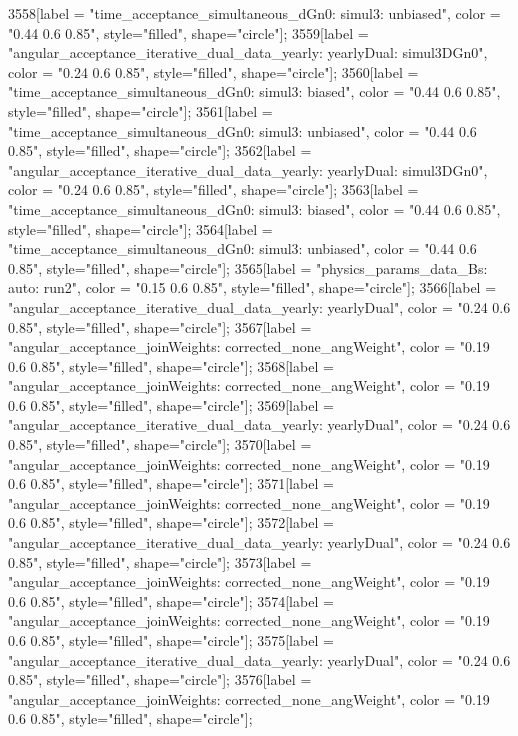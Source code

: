 {	3558[label = "time_acceptance_simultaneous_dGn0\ntimeacc: simul3\ntrigger: unbiased", color = "0.44 0.6 0.85", style="filled", shape="circle"];
	3559[label = "angular_acceptance_iterative_dual_data_yearly\nangacc: yearlyDual\ntimeacc: simul3DGn0", color = "0.24 0.6 0.85", style="filled", shape="circle"];
	3560[label = "time_acceptance_simultaneous_dGn0\ntimeacc: simul3\ntrigger: biased", color = "0.44 0.6 0.85", style="filled", shape="circle"];
	3561[label = "time_acceptance_simultaneous_dGn0\ntimeacc: simul3\ntrigger: unbiased", color = "0.44 0.6 0.85", style="filled", shape="circle"];
	3562[label = "angular_acceptance_iterative_dual_data_yearly\nangacc: yearlyDual\ntimeacc: simul3DGn0", color = "0.24 0.6 0.85", style="filled", shape="circle"];
	3563[label = "time_acceptance_simultaneous_dGn0\ntimeacc: simul3\ntrigger: biased", color = "0.44 0.6 0.85", style="filled", shape="circle"];
	3564[label = "time_acceptance_simultaneous_dGn0\ntimeacc: simul3\ntrigger: unbiased", color = "0.44 0.6 0.85", style="filled", shape="circle"];
	3565[label = "physics_params_data_Bs\nfit: auto\nyear: run2", color = "0.15 0.6 0.85", style="filled", shape="circle"];
	3566[label = "angular_acceptance_iterative_dual_data_yearly\nangacc: yearlyDual", color = "0.24 0.6 0.85", style="filled", shape="circle"];
	3567[label = "angular_acceptance_joinWeights\nwflag: corrected_none_angWeight", color = "0.19 0.6 0.85", style="filled", shape="circle"];
	3568[label = "angular_acceptance_joinWeights\nwflag: corrected_none_angWeight", color = "0.19 0.6 0.85", style="filled", shape="circle"];
	3569[label = "angular_acceptance_iterative_dual_data_yearly\nangacc: yearlyDual", color = "0.24 0.6 0.85", style="filled", shape="circle"];
	3570[label = "angular_acceptance_joinWeights\nwflag: corrected_none_angWeight", color = "0.19 0.6 0.85", style="filled", shape="circle"];
	3571[label = "angular_acceptance_joinWeights\nwflag: corrected_none_angWeight", color = "0.19 0.6 0.85", style="filled", shape="circle"];
	3572[label = "angular_acceptance_iterative_dual_data_yearly\nangacc: yearlyDual", color = "0.24 0.6 0.85", style="filled", shape="circle"];
	3573[label = "angular_acceptance_joinWeights\nwflag: corrected_none_angWeight", color = "0.19 0.6 0.85", style="filled", shape="circle"];
	3574[label = "angular_acceptance_joinWeights\nwflag: corrected_none_angWeight", color = "0.19 0.6 0.85", style="filled", shape="circle"];
	3575[label = "angular_acceptance_iterative_dual_data_yearly\nangacc: yearlyDual", color = "0.24 0.6 0.85", style="filled", shape="circle"];
	3576[label = "angular_acceptance_joinWeights\nwflag: corrected_none_angWeight", color = "0.19 0.6 0.85", style="filled", shape="circle"];
}

